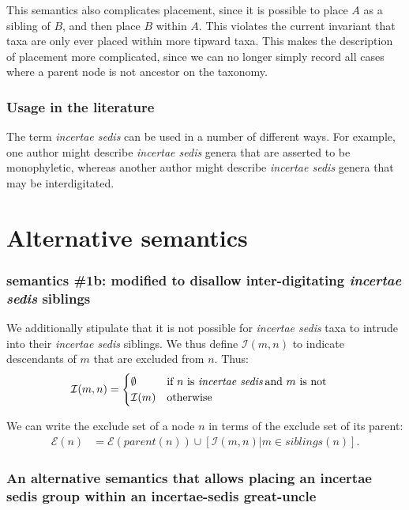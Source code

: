 \documentclass[english]{article}
\begin{document}
This semantics also complicates placement, since it is possible to
place $A$ as a sibling of $B$, and then place $B$ within $A$.
This
violates the current invariant that taxa are only ever placed within
more tipward taxa.
This makes the description of placement more
complicated, since we can no longer simply record all cases where a
parent node is not ancestor on the taxonomy.

\subsubsection{Usage in the literature}

The term \emph{incertae sedis} can be used in a number of different
ways.
For example,\emph{ }one author might describe \emph{incertae
sedis} genera that are asserted to be monophyletic, whereas another
author might describe \emph{incertae sedis} genera that may be
interdigitated.


\appendix
\section{Alternative semantics}
\subsubsection{semantics \#1b: modified to disallow inter-digitating
\emph{incertae sedis} siblings}


We additionally stipulate that it is not possible for \emph{incertae sedis} taxa
to intrude into their \emph{incertae sedis} siblings.  We thus define $\mathcal{I}(m,n)$ to
indicate descendants of $m$ that are excluded from $n$. Thus:
\begin{align*}
\mathcal{I}(m,n) & =
    \begin{cases}
        \emptyset & \text{if }n\text{ is \emph{incertae sedis}\,and }m\text{
is not}\\
        \mathcal{I}(m) & \text{otherwise}
    \end{cases}
\end{align*}

We can write the exclude set of a node $n$ in terms of
the exclude set of its parent:
\begin{eqnarray*}
    \mathcal{E}(n) & = \mathcal{E}(parent(n))\cup\left[\mathcal{I}(m,n)\big|m\in
           siblings(n)\right].
           \label{eq:exsetformone}
\end{eqnarray*}
\subsubsection{An alternative semantics that allows placing an incertae sedis group within an incertae-sedis great-uncle}
\end{document}
